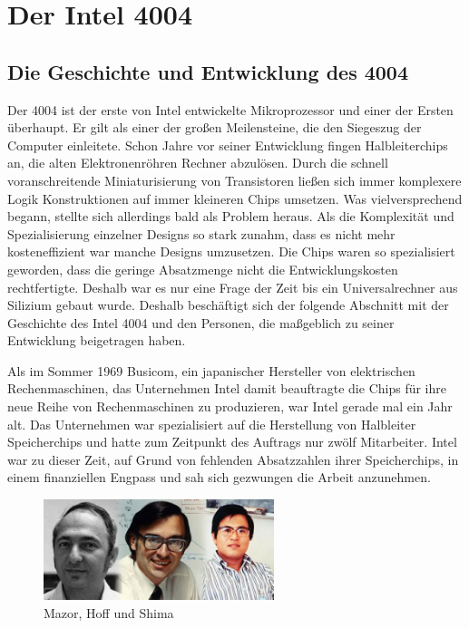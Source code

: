 \newpage
\chapter{Der Intel 4004}
\newpage
\section{Die Geschichte und Entwicklung des 4004}
Der 4004 ist der erste von Intel entwickelte Mikroprozessor und einer der Ersten überhaupt. Er gilt als einer der großen Meilensteine, die den Siegeszug der Computer einleitete. Schon Jahre vor seiner Entwicklung fingen Halbleiterchips an, die alten Elektronenröhren Rechner abzulösen. Durch die schnell voranschreitende Miniaturisierung von Transistoren ließen sich immer komplexere Logik Konstruktionen auf immer kleineren Chips umsetzen. Was vielversprechend begann, stellte sich allerdings bald als Problem heraus. Als die Komplexität und Spezialisierung einzelner Designs so stark zunahm, dass es nicht mehr kosteneffizient war manche Designs umzusetzen. Die Chips waren so spezialisiert geworden, dass die geringe Absatzmenge nicht die Entwicklungskosten rechtfertigte. Deshalb war es nur eine Frage der Zeit bis ein Universalrechner aus Silizium gebaut wurde. Deshalb beschäftigt sich der folgende Abschnitt mit der Geschichte des Intel 4004 und den Personen, die maßgeblich zu seiner Entwicklung beigetragen haben.


Als im Sommer 1969 Busicom, ein japanischer Hersteller von elektrischen Rechenmaschinen, das Unternehmen Intel damit beauftragte die Chips für ihre neue Reihe von Rechenmaschinen zu produzieren, war Intel gerade mal ein Jahr alt. Das Unternehmen war spezialisiert auf die Herstellung von Halbleiter Speicherchips und hatte zum Zeitpunkt des Auftrags nur zwölf Mitarbeiter. Intel war zu dieser Zeit, auf Grund von fehlenden Absatzzahlen ihrer Speicherchips, in einem finanziellen Engpass und sah sich gezwungen die Arbeit anzunehmen.
\vspace{-24pt}
\begin{figure}
	\vspace{20pt}
	\includegraphics[width=0.6\textwidth]{figures/creators1.jpeg}
	\caption{Mazor, Hoff und Shima}
	\label{fig:creators1}
	\vspace{-20pt}
\end{figure}

